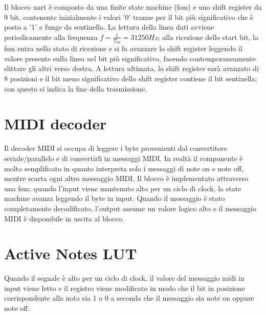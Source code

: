 Il blocco uart è composto da una finite state machine (fsm) e uno shift register da 9 bit, contenente inizialmente i valori '0' tranne per il bit più significativo che è posto a '1' e funge da sentinella. La lettura della linea dati avviene periodicamente alla frequenza $f = \frac{1}{T_{bit}} = 31250 \si{Hz}$; alla ricezione dello start bit, la fsm entra nello stato di ricezione e si fa avanzare lo shift register leggendo il valore presente sulla linea nel bit più significativo, facendo contemporaneamente slittare gli altri verso destra.
A lettura ultimata, lo shift register sarà avanzato di 8 posizioni e il bit meno significativo dello shift register contiene il bit sentinella; con questo si indica la fine della trasmissione.

\section{MIDI decoder}
\label{sec:mididec}

\begin{center}
\end{center}
Il decoder MIDI si occupa di leggere i byte provenienti dal convertitore seriale/parallelo e di convertirli in messaggi MIDI.
In realtà il componente è molto semplificato in quanto interpreta solo i messaggi di note on e note off, mentre scarta ogni altro messaggio MIDI.
Il blocco è implementato attraverso una fsm; quando l'input  viene mantenuto alto per un ciclo di clock, la state machine avanza leggendo il byte  in input.
Quando il messaggio è stato completamente decodificato, l'output  assume un valore logico alto e il messaggio MIDI è disponibile in uscita al blocco.

\section{Active Notes LUT}
\label{sec:noteslut}

\begin{center}
\end{center}
Quando il segnale  è alto per un ciclo di clock, il valore del messaggio midi in input viene letto e il registro  viene modificato in modo che il bit in posizione corrispondente alla nota sia 1 o 0 a seconda che il messaggio sia note on oppure note off.

